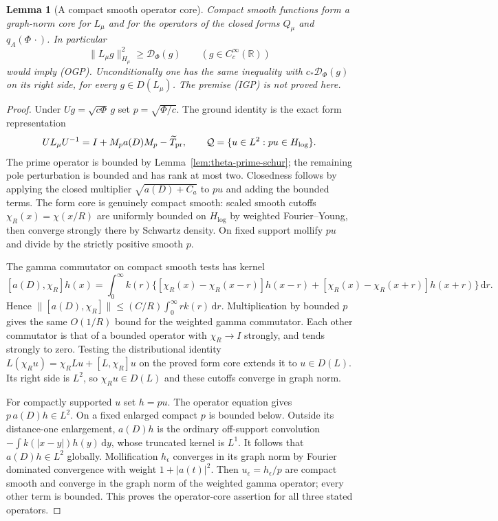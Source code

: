 \documentclass[11pt]{article}
\newtheorem{lemma}[theorem]{Lemma}
\theoremstyle{remark}\newtheorem{remark}[theorem]{Remark}
\newcommand{\R}{\mathbb R}
\newcommand{\dd}{\,\mathrm d}
\begin{document}
\begin{lemma}[A compact smooth operator core]
\label{lem:theta-operator-core}
Compact smooth functions form a graph-norm core for $L_\mu$
and for the operators of the closed forms $Q_\mu$ and
$q_A(\Phi\,\cdot)$. In particular
\[
 \|L_\mu g\|_{H_\mu}^2\ge\mathcal D_\Phi(g)
                       \qquad(g\in C_c^\infty(\R))          \tag{IGP}
\]
would imply (OGP). Unconditionally one has the same inequality
with $c_*\mathcal D_\Phi(g)$ on its right side, for every
$g\in D(L_\mu)$. The premise (IGP) is not proved here.
\end{lemma}
\begin{proof}
Under $Ug=\sqrt{c\Phi}\,g$ set $p=\sqrt{\Phi/c}$.
The ground identity is the exact form representation
\[
 UL_\mu U^{-1}=I+M_p a(D)M_p-\widetilde T_{\rm pr},
 \qquad \mathcal Q=\{u\in L^2:pu\in H_{\log}\}.
\]
The prime operator is bounded by
Lemma~\ref{lem:theta-prime-schur}; the remaining pole perturbation
is bounded and has rank at most two.
Closedness follows by applying the closed multiplier
$\sqrt{a(D)+C_a}$ to $pu$ and adding the bounded terms.
The form core is genuinely compact smooth: scaled smooth
cutoffs $\chi_R(x)=\chi(x/R)$ are uniformly bounded on
$H_{\log}$ by weighted Fourier--Young, then converge strongly
there by Schwartz density. On fixed support mollify $pu$ and
divide by the strictly positive smooth $p$.

The gamma commutator on compact smooth tests has kernel
\[
 [a(D),\chi_R]h(x)=\int_0^\infty k(r)
 \{[\chi_R(x)-\chi_R(x-r)]h(x-r)
    +[\chi_R(x)-\chi_R(x+r)]h(x+r)\}\dd r.
\]
Hence $\|[a(D),\chi_R]\|\le(C/R)\int_0^\infty rk(r)\dd r$.
Multiplication by bounded $p$ gives the same $O(1/R)$ bound
for the weighted gamma commutator. Each other commutator is
that of a bounded operator with $\chi_R\to I$ strongly,
and tends strongly to zero. Testing the distributional identity
$L(\chi_Ru)=\chi_RLu+[L,\chi_R]u$ on the proved form core
extends it to $u\in D(L)$. Its right side is $L^2$, so
$\chi_Ru\in D(L)$ and these cutoffs converge in graph norm.

For compactly supported $u$ set $h=pu$. The operator equation
gives $p\,a(D)h\in L^2$. On a fixed enlarged compact $p$
is bounded below. Outside its distance-one enlargement,
$a(D)h$ is the ordinary off-support convolution
$-\int k(|x-y|)h(y)\dd y$, whose truncated kernel is $L^1$.
It follows that $a(D)h\in L^2$ globally.
Mollification $h_\epsilon$ converges in its graph norm by
Fourier dominated convergence with weight $1+|a(t)|^2$.
Then $u_\epsilon=h_\epsilon/p$ are compact smooth and converge
in the graph norm of the weighted gamma operator; every other
term is bounded. This proves the operator-core assertion for
all three stated operators.


\end{proof}
\end{document}
